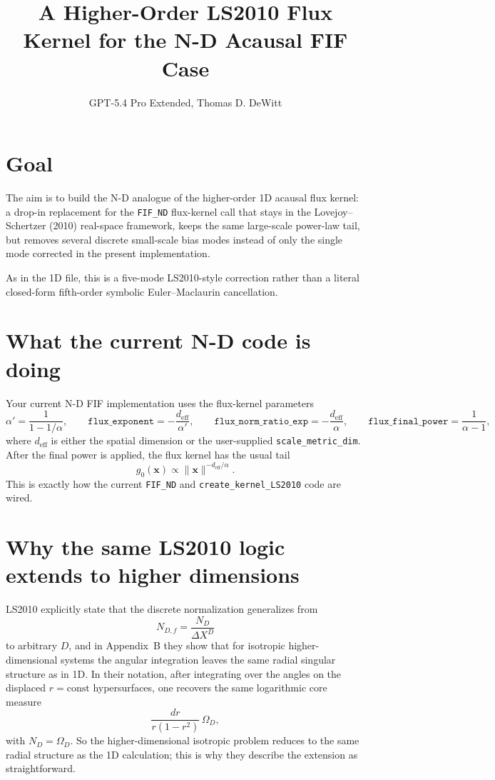 \documentclass[11pt]{article}
\title{A Higher-Order LS2010 Flux Kernel for the N-D Acausal FIF Case}
\author{GPT-5.4 Pro Extended, Thomas D. DeWitt}
\date{}
\begin{document}
\maketitle

\section{Goal}

The aim is to build the N-D analogue of the higher-order 1D acausal flux kernel:
a drop-in replacement for the \texttt{FIF\_ND} flux-kernel call that stays in the
Lovejoy--Schertzer (2010) real-space framework, keeps the same large-scale power-law
tail, but removes several discrete small-scale bias modes instead of only the single
mode corrected in the present implementation.

As in the 1D file, this is a five-mode LS2010-style correction rather than a literal
closed-form fifth-order symbolic Euler--Maclaurin cancellation.

\section{What the current N-D code is doing}

Your current N-D FIF implementation uses the flux-kernel parameters
\begin{equation}
\alpha' = \frac{1}{1-1/\alpha},
\qquad
\texttt{flux\_exponent} = -\frac{d_{\mathrm{eff}}}{\alpha'},
\qquad
\texttt{flux\_norm\_ratio\_exp} = -\frac{d_{\mathrm{eff}}}{\alpha},
\qquad
\texttt{flux\_final\_power} = \frac{1}{\alpha-1},
\end{equation}
where $d_{\mathrm{eff}}$ is either the spatial dimension or the user-supplied
\texttt{scale\_metric\_dim}.  After the final power is applied, the flux kernel has the
usual tail
\begin{equation}
 g_0(\bm x) \propto \|\bm x\|^{-d_{\mathrm{eff}}/\alpha}.
\end{equation}
This is exactly how the current \texttt{FIF\_ND} and \texttt{create\_kernel\_LS2010}
code are wired. 

\section{Why the same LS2010 logic extends to higher dimensions}

LS2010 explicitly state that the discrete normalization generalizes from
\begin{equation}
N_{D,f} = \frac{N_D}{\Delta X^D}
\end{equation}
to arbitrary $D$, and in Appendix~B they show that for isotropic higher-dimensional
systems the angular integration leaves the same radial singular structure as in 1D.
In their notation, after integrating over the angles on the displaced
$r=\mathrm{const}$ hypersurfaces, one recovers the same logarithmic core measure
\begin{equation}
\frac{dr}{r(1-r^2)}\,\Omega_D,
\end{equation}
with $N_D=\Omega_D$.  So the higher-dimensional isotropic problem reduces to the
same radial structure as the 1D calculation; this is why they describe the extension
as straightforward.
\end{document}
